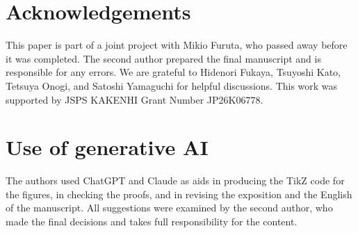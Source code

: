 \documentclass[a4paper,oneside,12pt]{amsart}
\theoremstyle{plain}
\theoremstyle{definition}
\theoremstyle{remark}
\begin{document}
\section*{Acknowledgements}
This paper is part of a joint project with Mikio Furuta, who passed away before it was completed.
The second author prepared the final manuscript and is responsible for any errors.
We are grateful to Hidenori Fukaya, Tsuyoshi Kato, Tetsuya Onogi, and Satoshi Yamaguchi for helpful discussions.
This work was supported by JSPS KAKENHI Grant Number JP26K06778.

\section*{Use of generative AI}
The authors used ChatGPT and Claude as aids in producing the TikZ code for the figures, in checking the proofs, and in revising the exposition and the English of the manuscript.
All suggestions were examined by the second author, who made the final decisions and takes full responsibility for the content.
\end{document}

